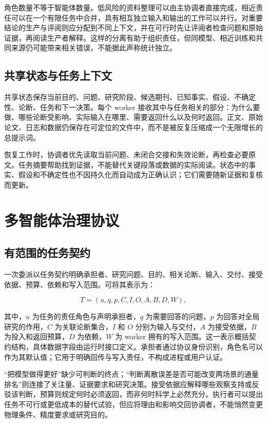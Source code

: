 \documentclass[UTF8,fontset=fandol,a4paper,11pt]{ctexart}
\begin{document}
角色数量不等于智能体数量。低风险的资料整理可以由主协调者直接完成，相近责任可以在一个有限任务中合并，具有相互独立输入和输出的工作可以并行。对重要结论的生产与评阅则应分配到不同上下文，并在可行时先让评阅者检查问题和原始证据，再阅读生产者解释。这样的分离有助于组织责任，但同模型、相近训练和共同来源仍可能带来相关错误，不能据此声称统计独立。

\subsection{共享状态与任务上下文}

共享状态保存当前目的、问题、研究阶段、候选期刊、已知事实、假设、不确定性、论断、任务和下一决策。每个 worker 接收其中与任务相关的部分：为什么要做、哪些论断受影响、实际输入在哪里、需要返回什么以及何时返回。正文、原始论文、日志和数据仍保存在可定位的文件中，而不是被反复压缩成一个无限增长的总提示词。

恢复工作时，协调者优先读取当前问题、未闭合交接和失效论断，再检查必要原文。任务摘要帮助找到证据，不能替代关键段落或数据的实际阅读。状态中的事实、假设和不确定性也不因持久化而自动成为正确认识；它们需要随新证据和复核而更新。

\section{多智能体治理协议}

\subsection{有范围的任务契约}

一次委派以任务契约明确承担者、研究问题、目的、相关论断、输入、交付、接受依据、预算、依赖和写入范围。可将其表示为：

\begin{equation}
T=(u,q,p,C,I,O,A,B,D,W),
\end{equation}

其中，$u$ 为任务的责任角色与声明承担者，$q$ 为需要回答的问题，$p$ 为回答对全局研究的作用，$C$ 为关联论断集合，$I$ 和 $O$ 分别为输入与交付，$A$ 为接受依据，$B$ 为投入和返回预算，$D$ 为依赖，$W$ 为 worker 拥有的写入范围。这一表示概括契约结构，具体数据字段由运行时接口定义。承担者通过协议身份识别，角色名可以作为其默认值；它用于明确回传与写入责任，不构成进程或用户认证。

“把模型做得更好”缺少可判断的终点；“判断离散误差是否可能改变两场景的通量排名”则连接了关注量、证据要求和研究决策。接受依据应解释哪些观察支持或反驳该判断，预算则规定何时必须返回，而非何时科学上必然充分。执行者可以提出任务不可行或更低成本的替代试验，但应将理由和影响交回协调者，不能悄然变更物理条件、精度要求或研究目的。
\end{document}

